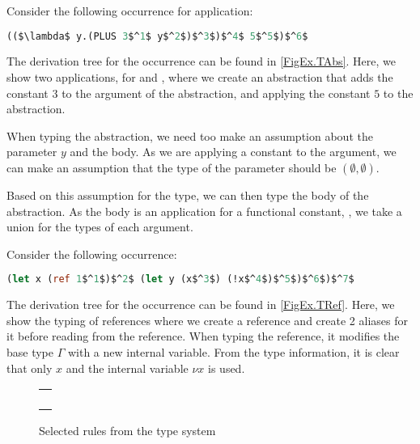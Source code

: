 \documentclass[../../master.tex]{subfiles}
\begin{document}
\begin{example}
	Consider the following occurrence for application:
	\begin{lstlisting}[language=Caml, mathescape=true]
		(($\lambda$ y.(PLUS 3$^1$ y$^2$)$^3$)$^4$ 5$^5$)$^6$
	\end{lstlisting}
	The derivation tree for the occurrence can be found in \cref{FigEx.TAbs}.
	Here, we show two applications, for  and , where we create an abstraction that adds the constant $3$ to the argument of the abstraction, and applying the constant $5$ to the abstraction.

	When typing the abstraction, we need too make an assumption about the parameter $y$ and the body.
	As we are applying a constant to the argument, we can make an assumption that the type of the parameter should be $(\emptyset,\emptyset)$.

	Based on this assumption for the type, we can then type the body of the abstraction.
	As the body is an application for a functional constant, , we take a union for the types of each argument.
\end{example}

\begin{example}
	Consider the following occurrence:
	\begin{lstlisting}[language=Caml, mathescape=true]
		(let x (ref 1$^1$)$^2$ (let y (x$^3$) (!x$^4$)$^5$)$^6$)$^7$
	\end{lstlisting}
	The derivation tree for the occurrence can be found in \cref{FigEx.TRef}.
	Here, we show the typing of references where we create a reference and create 2 aliases for it before reading from the reference.
	When typing the reference, it modifies the base type $\Gamma$ with a new internal variable.
	From the type information, it is clear that only $x$ and the internal variable $\nu x$ is used.
\end{example}

\begin{figure}[H]
	\setlength\tabcolsep{8pt}
	\begin{tabular}{l}
		\\[0.7cm]
		\\[0.7cm]
		\\[0.7cm]
		\\[0.7cm]
		\\[0.7cm]
	\end{tabular}
	\caption{Selected rules from the type system}
	\label{fig:TypeSys}
\end{figure}

\begin{landscape}

\end{landscape}
\end{document}
